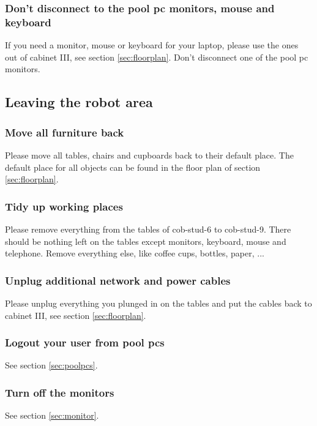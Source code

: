 \subsubsection{Don't disconnect to the pool pc monitors, mouse and keyboard}
If you need a monitor, mouse or keyboard for your laptop, please use the ones out of cabinet III, see section \ref{sec:floorplan}. Don't disconnect one of the pool pc monitors.

\subsection{Leaving the robot area}
\subsubsection{Move all furniture back}
Please move all tables, chairs and cupboards back to their default place. The default place for all objects can be found in the floor plan of section \ref{sec:floorplan}.

\subsubsection{Tidy up working places}\label{sec:tidyup}
Please remove everything from the tables of cob-stud-6 to cob-stud-9. There should be nothing left on the tables except monitors, keyboard, mouse and telephone. Remove everything else, like coffee cups, bottles, paper, ...

\subsubsection{Unplug additional network and power cables}
Please unplug everything you plunged in on the tables and put the cables back to cabinet III, see section \ref{sec:floorplan}.

\subsubsection{Logout your user from pool pcs}
See section \ref{sec:poolpcs}.

\subsubsection{Turn off the monitors}
See section \ref{sec:monitor}.


